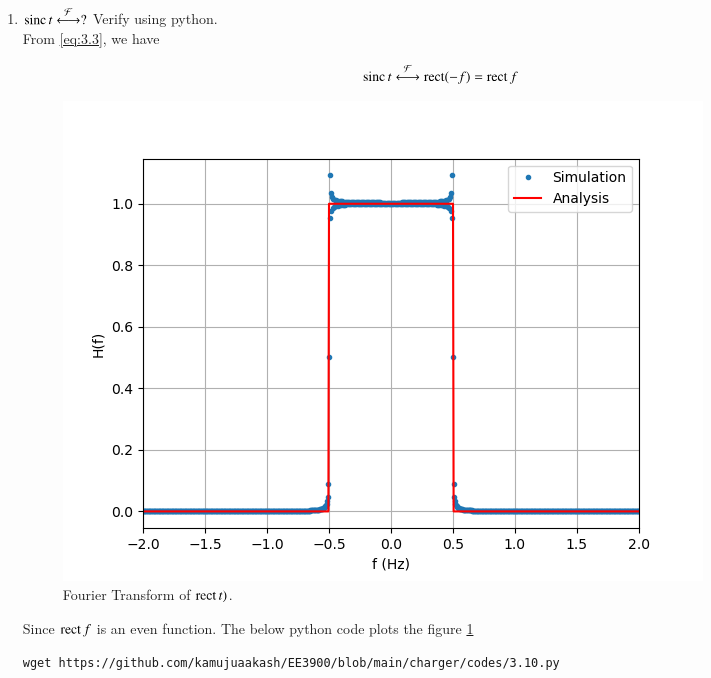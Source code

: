 \documentclass[journal,12pt,twocolumn]{IEEEtran}
\renewcommand\thesection{\arabic{section}}
\begin{document}
\begin{enumerate}[label=\thesection.\arabic*
	,ref=\thesection.\theenumi]
	\item $\mathop{\mathrm{sinc}}{t}\overset{\mathcal{F}}{ \longleftrightarrow} ?$  Verify using python.\\
	\solution From \eqref{eq:3.3}, we have 
	
	\begin{align}
		\mathop{\mathrm{sinc}}{t}\overset{\mathcal{F}}{ \longleftrightarrow}\mathop{\mathrm{rect}}(-f)=\mathop{\mathrm{rect}}{f}
		\label{eq:fourier-sinc}
	\end{align}
\begin{figure}[!ht]
	\includegraphics[width=\columnwidth]{figs/3.10.png}
	\caption{Fourier Transform of $\mathop{\mathrm{rect}}{t})$.}
	\label{fig:3.10}
\end{figure}
	Since $\mathop{\mathrm{rect}}{f}$ is an even function.
	The below python code plots the figure \ref{fig:3.10}
	\begin{lstlisting}
wget https://github.com/kamujuaakash/EE3900/blob/main/charger/codes/3.10.py
	\end{lstlisting} 

\end{enumerate}
\end{document}
